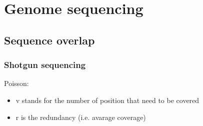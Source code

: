 \section{Genome sequencing}

\subsection{Sequence overlap}

\subsubsection{Shotgun sequencing}

Poisson:
\begin{itemize}
  \item v stands for the number of position that need to be covered
  \item r is the redundancy (i.e. avarage coverage)
\end{itemize}

